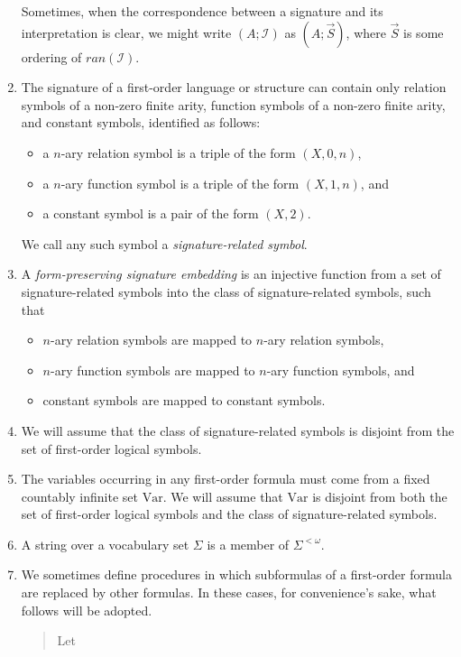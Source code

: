 \documentclass[12pt]{article}
\numberwithin{equation}{section}
\begin{document}
\begin{con}
\begin{enumerate}[label=(\arabic*)]
    Sometimes, when the correspondence between a signature and its interpretation is clear, we might write $(A; \mathcal{I})$ as $(A; \Vec{S})$, where $\Vec{S}$ is some ordering of $ran(\mathcal{I})$.
    \item The signature of a first-order language or structure can contain only relation symbols of a non-zero finite arity, function symbols of a non-zero finite arity, and constant symbols, identified as follows:
    \begin{itemize}
        \item a $n$-ary relation symbol is a triple of the form $(X, 0, n)$,
        \item a $n$-ary function symbol is a triple of the form $(X, 1, n)$, and
        \item a constant symbol is a pair of the form $(X, 2)$.
    \end{itemize}
    We call any such symbol a \emph{signature-related symbol}.
    \item A \emph{form-preserving signature embedding} is an injective function from a set of signature-related symbols into the class of signature-related symbols, such that
    \begin{itemize}
        \item $n$-ary relation symbols are mapped to $n$-ary relation symbols,
        \item $n$-ary function symbols are mapped to $n$-ary function symbols, and
        \item constant symbols are mapped to constant symbols.
    \end{itemize}
    \item\label{227} We will assume that the class of signature-related symbols is disjoint from the set of first-order logical symbols.
    \item\label{224} The variables occurring in any first-order formula must come from a fixed countably infinite set $\mathrm{Var}$. We will assume that $\mathrm{Var}$ is disjoint from both the set of first-order logical symbols and the class of signature-related symbols.
    \item A string over a vocabulary set $\Sigma$ is a member of $\Sigma^{< \omega}$.
    \item We sometimes define procedures in which subformulas of a first-order formula are replaced by other formulas. In these cases, for convenience's sake, what follows will be adopted.
    \begin{quote}
        Let 
        \begin{itemize}

\end{itemize}
\end{quote}
\end{enumerate}
\end{con}
\end{document}
